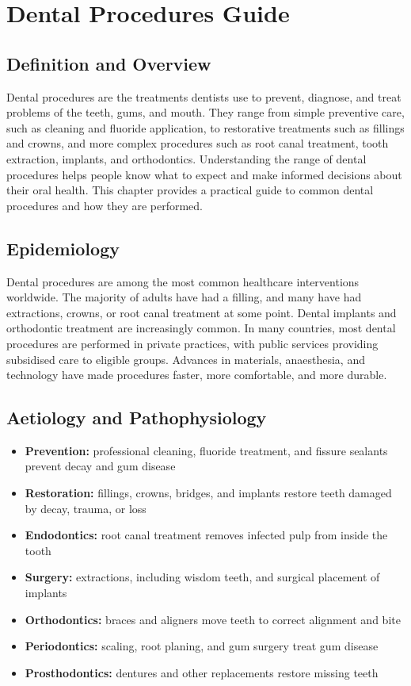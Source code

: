 \chapter{Dental Procedures Guide}

\section*{Definition and Overview}
Dental procedures are the treatments dentists use to prevent, diagnose, and treat problems of the teeth, gums, and mouth. They range from simple preventive care, such as cleaning and fluoride application, to restorative treatments such as fillings and crowns, and more complex procedures such as root canal treatment, tooth extraction, implants, and orthodontics. Understanding the range of dental procedures helps people know what to expect and make informed decisions about their oral health. This chapter provides a practical guide to common dental procedures and how they are performed.

\section*{Epidemiology}
Dental procedures are among the most common healthcare interventions worldwide. The majority of adults have had a filling, and many have had extractions, crowns, or root canal treatment at some point. Dental implants and orthodontic treatment are increasingly common. In many countries, most dental procedures are performed in private practices, with public services providing subsidised care to eligible groups. Advances in materials, anaesthesia, and technology have made procedures faster, more comfortable, and more durable.

\section*{Aetiology and Pathophysiology}
\begin{itemize}
    \item \textbf{Prevention:} professional cleaning, fluoride treatment, and fissure sealants prevent decay and gum disease
    \item \textbf{Restoration:} fillings, crowns, bridges, and implants restore teeth damaged by decay, trauma, or loss
    \item \textbf{Endodontics:} root canal treatment removes infected pulp from inside the tooth
    \item \textbf{Surgery:} extractions, including wisdom teeth, and surgical placement of implants
    \item \textbf{Orthodontics:} braces and aligners move teeth to correct alignment and bite
    \item \textbf{Periodontics:} scaling, root planing, and gum surgery treat gum disease
    \item \textbf{Prosthodontics:} dentures and other replacements restore missing teeth
\end{itemize}

